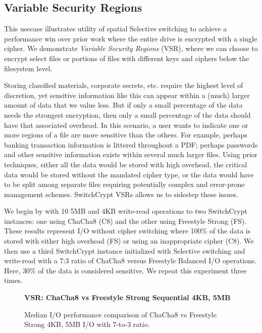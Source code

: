 \subsection{Variable Security Regions} \label{subsec:uc2}

This usecase illustrates utility of spatial Selective switching to achieve a
performance win over prior work where the entire drive is encrypted with a
single cipher. We demonstrate \emph{Variable Security Regions} (VSR), where we
can choose to encrypt select files or portions of files with different keys and
ciphers below the filesystem level.

Storing classified materials, corporate secrets, etc. require the highest level
of discretion, yet sensitive information like this can appear within a (much)
larger amount of data that we value less. But if only a small percentage of the
data needs the strongest encryption, then only a small percentage of the data
should have that associated overhead. In this scenario, a user wants to indicate
one or more regions of a file are more sensitive than the others. For example,
perhaps banking transaction information is littered throughout a PDF; perhaps
passwords and other sensitive information exists within several much larger
files. Using prior techniques, either all the data would be stored with high
overhead, the critical data would be stored without the mandated cipher type, or
the data would have to be split among separate files requiring potentially
complex and error-prone management schemes. SwitchCrypt VSRs allows us to
sidestep these issues.

We begin by with 10 5MB and 4KB write-read operations to two
SwitchCrypt instances: one using ChaCha8 (C8) and the other using Freestyle
Strong (FS). These results represent I/O without cipher switching where 100\% of
the data is stored with either high overhead (FS) or using an inappropriate
cipher (C8). We then use a third SwitchCrypt instance initialized with Selective
switching and write-read with a 7:3 ratio of ChaCha8 versus Freestyle
Balanced I/O operations. Here, 30\% of the data is considered sensitive. We
repeat this experiment three times.

\begin{figure}[ht] \textbf{VSR: ChaCha8 vs Freestyle Strong Sequential
    4KB, 5MB}\par\medskip \centering
  {} \caption{Median I/O performance
    comparison of ChaCha8 vs Freestyle Strong 4KB, 5MB I/O with 7-to-3
    ratio. }
  \label{fig:usecase-vsr-bar}
\end{figure}

